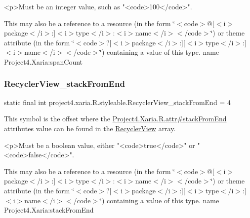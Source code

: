 \begin{DoxyVerb}      <p>Must be an integer value, such as "<code>100</code>".
\end{DoxyVerb}
 

This may also be a reference to a resource (in the form \char`\"{}$<$code$>$@\mbox{[}$<$i$>$package$<$/i$>$\+:\mbox{]}$<$i$>$type$<$/i$>$\+:$<$i$>$name$<$/i$>$$<$/code$>$\char`\"{}) or theme attribute (in the form \char`\"{}$<$code$>$?\mbox{[}$<$i$>$package$<$/i$>$\+:\mbox{]}\mbox{[}$<$i$>$type$<$/i$>$\+:\mbox{]}$<$i$>$name$<$/i$>$$<$/code$>$\char`\"{}) containing a value of this type.  name Project4.\+Xaria\+:span\+Count \mbox{\label{classproject4_1_1xaria_1_1R_1_1styleable_a1ef8e9797ba63acf022ba0898d24b5a1}} 
\subsubsection{\texorpdfstring{Recycler\+View\+\_\+stack\+From\+End}{RecyclerView\_stackFromEnd}}
{\footnotesize\ttfamily static final int project4.\+xaria.\+R.\+styleable.\+Recycler\+View\+\_\+stack\+From\+End = 4\hspace{0.3cm}{\ttfamily [static]}}

This symbol is the offset where the \hyperlink{}{Project4.\+Xaria.\+R.\+attr\#stack\+From\+End} attribute\textquotesingle{}s value can be found in the \hyperlink{classproject4_1_1xaria_1_1R_1_1styleable_ad70c99b52204a6206f85345454bda20d}{Recycler\+View} array.

\begin{DoxyVerb}      <p>Must be a boolean value, either "<code>true</code>" or "<code>false</code>".
\end{DoxyVerb}
 

This may also be a reference to a resource (in the form \char`\"{}$<$code$>$@\mbox{[}$<$i$>$package$<$/i$>$\+:\mbox{]}$<$i$>$type$<$/i$>$\+:$<$i$>$name$<$/i$>$$<$/code$>$\char`\"{}) or theme attribute (in the form \char`\"{}$<$code$>$?\mbox{[}$<$i$>$package$<$/i$>$\+:\mbox{]}\mbox{[}$<$i$>$type$<$/i$>$\+:\mbox{]}$<$i$>$name$<$/i$>$$<$/code$>$\char`\"{}) containing a value of this type.  name Project4.\+Xaria\+:stack\+From\+End \mbox{\label{classproject4_1_1xaria_1_1R_1_1styleable_aced6ff23371b3f5a2ea43a4c9a57f9eb}} 
